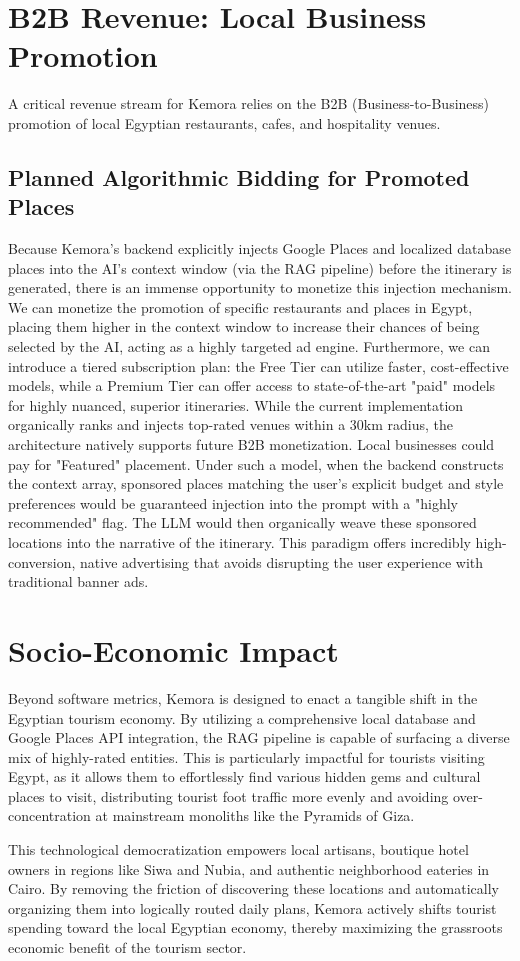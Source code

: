\section{B2B Revenue: Local Business Promotion}
A critical revenue stream for Kemora relies on the B2B (Business-to-Business) promotion of local Egyptian restaurants, cafes, and hospitality venues.

\subsection{Planned Algorithmic Bidding for Promoted Places}
Because Kemora's backend explicitly injects Google Places and localized database places into the AI's context window (via the RAG pipeline) before the itinerary is generated, there is an immense opportunity to monetize this injection mechanism. We can monetize the promotion of specific restaurants and places in Egypt, placing them higher in the context window to increase their chances of being selected by the AI, acting as a highly targeted ad engine. Furthermore, we can introduce a tiered subscription plan: the Free Tier can utilize faster, cost-effective models, while a Premium Tier can offer access to state-of-the-art "paid" models for highly nuanced, superior itineraries. 
While the current implementation organically ranks and injects top-rated venues within a 30km radius, the architecture natively supports future B2B monetization. Local businesses could pay for "Featured" placement. Under such a model, when the backend constructs the context array, sponsored places matching the user's explicit budget and style preferences would be guaranteed injection into the prompt with a "highly recommended" flag. The LLM would then organically weave these sponsored locations into the narrative of the itinerary. This paradigm offers incredibly high-conversion, native advertising that avoids disrupting the user experience with traditional banner ads.

\section{Socio-Economic Impact}
Beyond software metrics, Kemora is designed to enact a tangible shift in the Egyptian tourism economy. By utilizing a comprehensive local database and Google Places API integration, the RAG pipeline is capable of surfacing a diverse mix of highly-rated entities. This is particularly impactful for tourists visiting Egypt, as it allows them to effortlessly find various hidden gems and cultural places to visit, distributing tourist foot traffic more evenly and avoiding over-concentration at mainstream monoliths like the Pyramids of Giza.

This technological democratization empowers local artisans, boutique hotel owners in regions like Siwa and Nubia, and authentic neighborhood eateries in Cairo. By removing the friction of discovering these locations and automatically organizing them into logically routed daily plans, Kemora actively shifts tourist spending toward the local Egyptian economy, thereby maximizing the grassroots economic benefit of the tourism sector.
